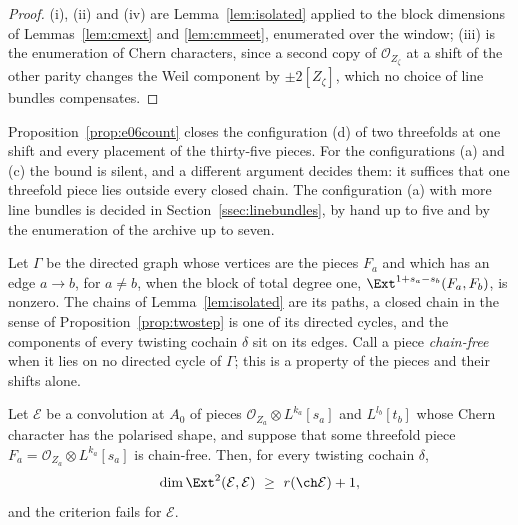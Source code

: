 \begin{proof}
(i), (ii) and (iv) are Lemma~\ref{lem:isolated} applied to the block dimensions of Lemmas~\ref{lem:cmext} and \ref{lem:cmmeet}, enumerated over the window; (iii) is the enumeration of Chern characters, since a second copy of $\mathcal{O}_{Z_{\zeta}}$ at a shift of the other parity changes the Weil component by $\pm2[Z_{\zeta}]$, which no choice of line bundles compensates.
\end{proof}

Proposition~\ref{prop:e06count} closes the configuration (d) of two threefolds at one shift and every placement of the thirty-five pieces. For the configurations (a) and (c) the bound is silent, and a different argument decides them: it suffices that one threefold piece lies outside every closed chain. The configuration (a) with more line bundles is decided in Section~\ref{ssec:linebundles}, by hand up to five and by the enumeration of the archive up to seven.

Let $\Gamma$ be the directed graph whose vertices are the pieces $F_{a}$ and which has an edge $a\to b$, for $a\ne b$, when the block of total degree one, $\Ext^{1+s_{a}-s_{b}}(F_{a},F_{b})$, is nonzero. The chains of Lemma~\ref{lem:isolated} are its paths, a closed chain in the sense of Proposition~\ref{prop:twostep} is one of its directed cycles, and the components of every twisting cochain $\delta$ sit on its edges. Call a piece \emph{chain-free} when it lies on no directed cycle of $\Gamma$; this is a property of the pieces and their shifts alone.

\begin{proposition}\label{prop:chainfree}
Let $\mathcal{E}$ be a convolution at $A_{0}$ of pieces $\mathcal{O}_{Z_{a}}\otimes L^{k_{a}}[s_{a}]$ and $L^{l_{b}}[t_{b}]$ whose Chern character has the polarised shape, and suppose that some threefold piece $F_{a}=\mathcal{O}_{Z_{a}}\otimes L^{k_{a}}[s_{a}]$ is chain-free. Then, for every twisting cochain $\delta$,
\[
\dim\Ext^{2}(\mathcal{E},\mathcal{E})\ \ge\ r(\ch\mathcal{E})+1 ,
\]
and the criterion fails for $\mathcal{E}$.
\end{proposition}

